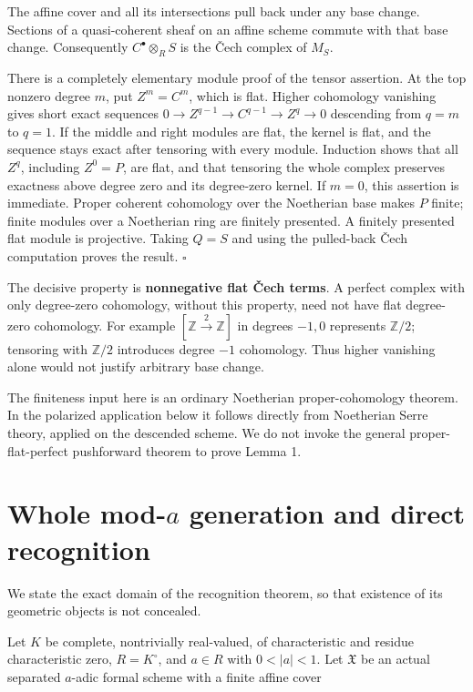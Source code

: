 \documentclass[
  11pt,
]{article}
\begin{document}
The affine cover and all its intersections pull back under any base
change. Sections of a quasi-coherent sheaf on an affine scheme commute
with that base change. Consequently \(C^\bullet\otimes_RS\) is the Čech
complex of \(M_S\).

There is a completely elementary module proof of the tensor assertion.
At the top nonzero degree \(m\), put \(Z^m=C^m\), which is flat. Higher
cohomology vanishing gives short exact sequences
\(0\to Z^{q-1}\to C^{q-1}\to Z^q\to0\) descending from \(q=m\) to
\(q=1\). If the middle and right modules are flat, the kernel is flat,
and the sequence stays exact after tensoring with every module.
Induction shows that all \(Z^q\), including \(Z^0=P\), are flat, and
that tensoring the whole complex preserves exactness above degree zero
and its degree-zero kernel. If \(m=0\), this assertion is immediate.
Proper coherent cohomology over the Noetherian base makes \(P\) finite;
finite modules over a Noetherian ring are finitely presented. A finitely
presented flat module is projective. Taking \(Q=S\) and using the
pulled-back Čech computation proves the result. \(\square\)

The decisive property is \textbf{nonnegative flat Čech terms}. A perfect
complex with only degree-zero cohomology, without this property, need
not have flat degree-zero cohomology. For example
\([\mathbb Z\xrightarrow{2}\mathbb Z]\) in degrees \(-1,0\) represents
\(\mathbb Z/2\); tensoring with \(\mathbb Z/2\) introduces degree \(-1\)
cohomology. Thus higher vanishing alone would not justify arbitrary base
change.

The finiteness input here is an ordinary Noetherian proper-cohomology
theorem. In the polarized application below it follows directly from
Noetherian Serre theory, applied on the descended scheme. We do not
invoke the general proper-flat-perfect pushforward theorem to prove
Lemma 1.

\section{\texorpdfstring{Whole mod-\(a\) generation and direct
recognition}{Whole mod-a generation and direct recognition}}\label{whole-mod-a-generation-and-direct-recognition}

We state the exact domain of the recognition theorem, so that existence
of its geometric objects is not concealed.

Let \(K\) be complete, nontrivially real-valued, of characteristic and
residue characteristic zero, \(R=K^\circ\), and \(a\in R\) with
\(0<|a|<1\). Let \(\mathfrak X\) be an actual separated \(a\)-adic
formal scheme with a finite affine cover
\end{document}
